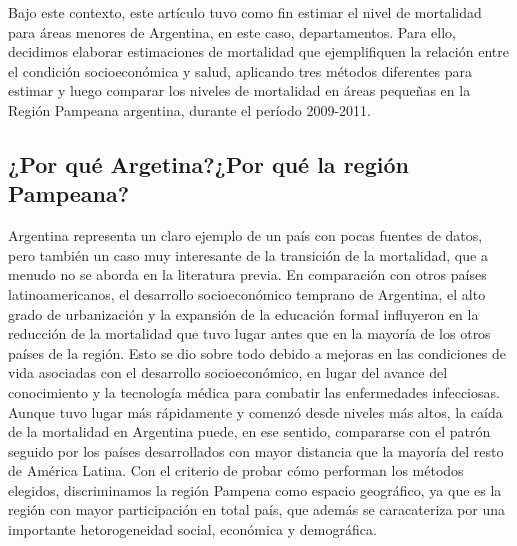 \documentclass[12pt,]{article}
\begin{document}
Bajo este contexto, este artículo tuvo como fin estimar el nivel de
mortalidad para áreas menores de Argentina, en este caso, departamentos.
Para ello, decidimos elaborar estimaciones de mortalidad que
ejemplifiquen la relación entre el condición socioeconómica y salud,
aplicando tres métodos diferentes para estimar y luego comparar los
niveles de mortalidad en áreas pequeñas en la Región Pampeana argentina,
durante el período 2009-2011.

\hypertarget{por-quuxe9-argetinapor-quuxe9-la-regiuxf3n-pampeana}{%
\subsection{¿Por qué Argetina?¿Por qué la región
Pampeana?}\label{por-quuxe9-argetinapor-quuxe9-la-regiuxf3n-pampeana}}

Argentina representa un claro ejemplo de un país con pocas fuentes de
datos, pero también un caso muy interesante de la transición de la
mortalidad, que a menudo no se aborda en la literatura previa. En
comparación con otros países latinoamericanos, el desarrollo
socioeconómico temprano de Argentina, el alto grado de urbanización y la
expansión de la educación formal influyeron en la reducción de la
mortalidad que tuvo lugar antes que en la mayoría de los otros países de
la región. Esto se dio sobre todo debido a mejoras en las condiciones de
vida asociadas con el desarrollo socioeconómico, en lugar del avance del
conocimiento y la tecnología médica para combatir las enfermedades
infecciosas. Aunque tuvo lugar más rápidamente y comenzó desde niveles
más altos, la caída de la mortalidad en Argentina puede, en ese sentido,
compararse con el patrón seguido por los países desarrollados con mayor
distancia que la mayoría del resto de América Latina. Con el criterio de
probar cómo performan los métodos elegidos, discriminamos la región
Pampena como espacio geográfico, ya que es la región con mayor
participación en total país, que además se caracateriza por una
importante hetorogeneidad social, económica y demográfica.
\end{document}
